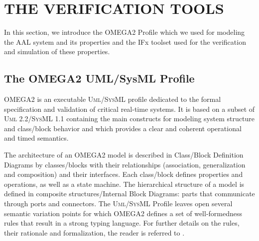 \documentclass[a4paper,twoside]{article}
\def\sysml{\textsc{SysML}}
\def\uml{\textsc{Uml}}
\begin{document}

\section{\uppercase{The verification tools}}
\label{sec:tools}
\noindent In this section, we introduce the OMEGA2 Profile which we used for modeling the AAL system and its properties and the IFx toolset used for the verification and simulation of these properties. 

\subsection{The OMEGA2 UML/SysML Profile}

OMEGA2 is an executable \uml{}/\sysml{} profile dedicated to the formal specification and validation of critical real-time systems. It is based on a subset of \uml{} 2.2/\sysml{} 1.1 containing the main constructs for modeling system structure and class/block behavior and which provides a clear and coherent operational and timed semantics.


The architecture of an OMEGA2 model is described in Class/Block Definition Diagrams by classes/blocks with their relationships (association, generalization and composition) and their interfaces. Each class/block defines properties and operations, as well as a state machine. The hierarchical structure of a model is defined in composite structures/Internal Block Diagrams: parts that communicate through ports and connectors. The \uml{}/\sysml{} Profile leaves open several semantic variation points for which OMEGA2 defines a set of well-formedness rules that result in a strong typing language. For further details on the rules, their rationale and formalization, the reader is referred to \cite{test13}.
\end{document}
